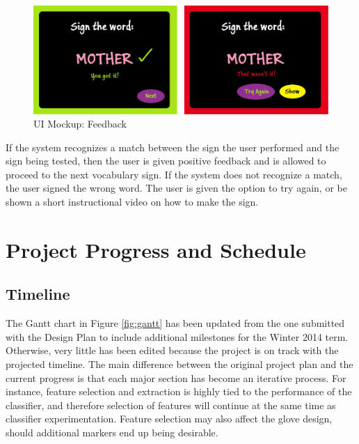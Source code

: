 \documentclass[12pt]{article}
\begin{document}
\begin{figure}[H]
  \centering
  \includegraphics[scale=1]{Mother2.png}
  \caption{UI Mockup: Feedback}
  \label{fig:ui2}
\end{figure}

If the system recognizes a match between the sign the user performed and the sign being tested, then the user is given positive feedback and is allowed to proceed to the next vocabulary sign. If the system does not recognize a match, the user signed the wrong word. The user is given the option to try again, or be shown a short instructional video on how to make the sign. 

\newpage
\section{Project Progress and Schedule}
\subsection{Timeline}
The Gantt chart in Figure \ref{fig:gantt} has been updated from the one submitted with the Design Plan to include additional milestones for the Winter 2014 term. Otherwise, very little has been edited because the project is on track with the projected timeline. The main difference between the original project plan and the current progress is that each major section has become an iterative process. For instance, feature selection and extraction is highly tied to the performance of the classifier, and therefore selection of features will continue at the same time as classifier experimentation. Feature selection may also affect the glove design, should additional markers end up being desirable. 
\end{document}
